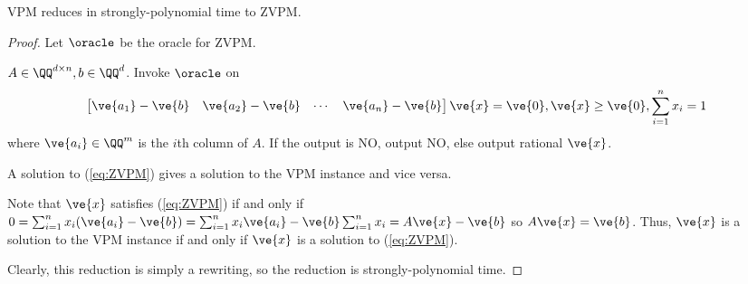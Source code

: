 \begin{lemma} VPM reduces in strongly-polynomial time to ZVPM.
\end{lemma}

\begin{proof}
Let $\oracle$ be the oracle for ZVPM.
\begin{algorithmic}
\Require $A \in \QQ^{d \times n}, b \in \QQ^{d}$.
\State Invoke $\oracle$ on 
\begin{equation}\label{eq:ZVPM}
    \begin{bmatrix} \ve{a_1}-\ve{b} & \ve{a_2} - \ve{b} & \cdots & \ve{a_n} - \ve{b} \end{bmatrix} \ve{x} = \ve{0}, \ve{x} \ge \ve{0}, \sum_{i=1}^n x_i = 1
\end{equation} where $\ve{a_i} \in \QQ^m$ is the $i$th column of $A$.  If the output is NO, output NO, else output rational $\ve{x}$.
\end{algorithmic}

\begin{claim} 
A solution to (\ref{eq:ZVPM}) gives a solution to the VPM instance and vice versa.
\end{claim}

\begin{claimproof}
Note that $\ve{x}$ satisfies (\ref{eq:ZVPM}) if and only if $0 = \sum_{i=1}^n x_i(\ve{a_i} -\ve{b}) = \sum_{i=1}^n x_i \ve{a_i} - \ve{b} \sum_{i=1}^n x_i = A\ve{x} - \ve{b}$ so $A\ve{x} = \ve{b}$.  
Thus, $\ve{x}$ is a solution to the VPM instance if and only if $\ve{x}$ is a solution to (\ref{eq:ZVPM}). 
\end{claimproof}

Clearly, this reduction is simply a rewriting, so the reduction is strongly-polynomial time.
\end{proof}




